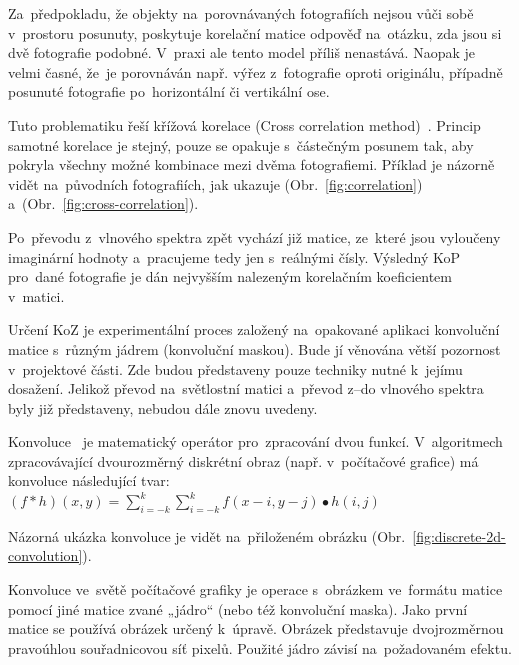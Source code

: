 Za~předpokladu, že objekty na~porovnávaných fotografiích nejsou vůči sobě v~prostoru posunuty, poskytuje korelační matice odpověď na~otázku, zda jsou si dvě fotografie podobné. V~praxi ale tento model příliš nenastává. Naopak je velmi časné, že~je porovnáván např. výřez z~fotografie oproti originálu, případně posunuté fotografie po~horizontální či vertikální ose.

Tuto problematiku řeší křížová korelace (Cross correlation method)~\cite{cross-correlation}. Princip samotné korelace je stejný, pouze se opakuje s~částečným posunem tak, aby pokryla všechny možné kombinace mezi dvěma fotografiemi. Příklad je názorně vidět na~původních fotografiích, jak ukazuje (Obr.~\ref{fig:correlation}) a~(Obr.~\ref{fig:cross-correlation}).



Po~převodu z~vlnového spektra zpět vychází již matice, ze~které jsou vyloučeny imaginární hodnoty a~pracujeme tedy jen s~reálnými čísly. Výsledný KoP pro~dané fotografie je dán nejvyšším nalezeným korelačním koeficientem v~matici.

Určení KoZ je experimentální proces založený na~opakované aplikaci konvoluční matice s~různým jádrem (konvoluční maskou). Bude jí věnována větší pozornost v~projektové části. Zde budou představeny pouze techniky nutné k~jejímu dosažení. Jelikož převod na~světlostní matici a~převod z--do vlnového spektra byly již představeny, nebudou dále znovu uvedeny.

Konvoluce~\cite{convolition} je matematický operátor pro~zpracování dvou funkcí. V~algoritmech zpracovávající dvourozměrný diskrétní obraz (např. v~počítačové grafice) má konvoluce následující tvar:
$ (f*h)(x,y)=\sum\limits_{i=-k}^{k} \sum\limits_{i=-k}^{k} f(x-i,y-j) \bullet h(i,j)$

Názorná ukázka konvoluce je vidět na~přiloženém obrázku (Obr.~\ref{fig:discrete-2d-convolution}).


Konvoluce ve~světě počítačové grafiky je operace s~obrázkem ve~formátu matice pomocí jiné matice zvané „jádro“ (nebo též konvoluční maska). Jako první matice se používá obrázek určený k~úpravě. Obrázek představuje dvojrozměrnou pravoúhlou souřadnicovou síť pixelů. Použité jádro závisí na~požadovaném efektu.

